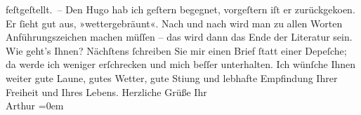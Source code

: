 \begin{ledgroupsized}[t]{13cm}
               feſtgeſtellt. –\pend
           \pstart
           Den Hugo hab ich geſtern begegnet, vorgeſtern
               iſt er zurückgeko{\geminationm}en. Er ſieht gut aus,
               »wettergebräunt«. Nach und nach wird man zu allen Worten Anführungszeichen {\pb}machen müſſen – das wird dann das Ende der Literatur
               sein.\pend
           \pstart
           Wie geht’s Ihnen? Nächſtens ſchreiben Sie mir einen Brief ſtatt einer Depeſche; da
               werde ich weniger erſchrecken und mich beſſer unterhalten. Ich wünſche Ihnen weiter
               gute Laune, {\pb}gutes Wetter, gute Sti{\geminationm}ung und lebhafte Empfindung Ihrer Freiheit und Ihres
               Lebens.\pend
           \pstart
           Herzliche Grüße Ihr{\\[\baselineskip]}\spacefill\mbox{Arthur}\pend
           \leftskip=0em{}
         
         \endnumbering{}\end{ledgroupsized}  \newcommand{\dateiname}{L00489}\newcommand{\titel}{Arthur Schnitzler an Richard Beer-Hofmann, 21. 9. 1895}\newcommand{\editorInnen}{Martin Anton Müller und Gerd-Hermann Susen}
      
